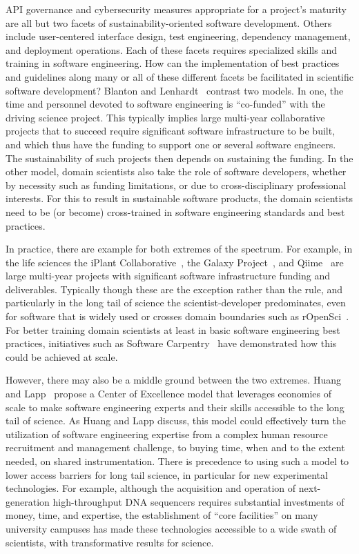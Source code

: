 \documentclass[11pt, oneside]{amsart}
\newcommand{\toolname}[1] {\textsf{#1}}
\begin{document}
API governance and cybersecurity measures appropriate for a project's
maturity are all but two facets of sustainability-oriented software
development. Others include user-centered interface design, test
engineering, dependency management, and deployment operations. Each of
these facets requires specialized skills and training in software
engineering. How can the implementation of best practices and
guidelines along many or all of these different facets be facilitated
in scientific software development? Blanton and
Lenhardt~\cite{Blanton_WSSSPE} contrast two models. In one, the time
and personnel devoted to software engineering is ``co-funded'' with
the driving science project. This typically implies large multi-year
collaborative projects that to succeed require significant software
infrastructure to be built, and which thus have the funding to support
one or several software engineers. The sustainability of such projects
then depends on sustaining the funding. In the other model, domain
scientists also take the role of software developers, whether by
necessity such as funding limitations, or due to cross-disciplinary
professional interests. For this to result in sustainable software
products, the domain scientists need to be (or become) cross-trained
in software engineering standards and best practices.

In practice, there are example for both extremes of the spectrum. For
example, in the life sciences the iPlant Collaborative~\cite{iPlant},
the Galaxy Project~\cite{Galaxy}, and \toolname{Qiime}~\cite{Qiime} are large
multi-year projects with significant software infrastructure funding
and deliverables. Typically though these are the exception rather than
the rule, and particularly in the long tail of science the
scientist-developer predominates, even for software that is widely
used or crosses domain boundaries such as
\toolname{rOpenSci}~\cite{rOpenSci}. For better training domain scientists at
least in basic software engineering best practices, initiatives such
as Software Carpentry~\cite{SoftwareCarpentry} have demonstrated how
this could be achieved at scale.

However, there may also be a middle ground between the two
extremes. Huang and Lapp~\cite{Huang_WSSSPE} propose a Center of
Excellence model that leverages economies of scale to make software
engineering experts and their skills accessible to the long tail of
science. As Huang and Lapp discuss, this model could effectively turn
the utilization of software engineering expertise from a complex human
resource recruitment and management challenge, to buying time, when
and to the extent needed, on shared instrumentation. There is
precedence to using such a model to lower access barriers for long
tail science, in particular for new experimental technologies.  For
example, although the acquisition and operation of next-generation
high-throughput DNA sequencers requires substantial investments of
money, time, and expertise, the establishment of ``core facilities''
on many university campuses has made these technologies accessible to
a wide swath of scientists, with transformative results for science.
\end{document}
